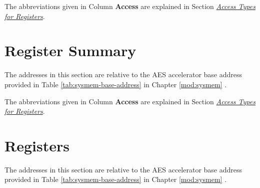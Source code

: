\documentclass[main\_\_EN.tex]{subfiles}
\begin{document}
The abbreviations given in Column \textbf{Access} are explained in Section \hyperref[glossary-access-types]{\textit{Access Types for Registers}}.



\clearpage

\hypertarget{aes-reg-summ}{}
\section{Register Summary}

The addresses in this section are relative to the AES accelerator base address provided in Table \ref{tab:sysmem-base-address} in Chapter \ref{mod:sysmem} \textit{}.

The abbreviations given in Column \textbf{Access} are explained in Section \hyperref[glossary-access-types]{\textit{Access Types for Registers}}.


\clearpage
\section{Registers}
The addresses in this section are relative to the AES accelerator base address provided in Table \ref{tab:sysmem-base-address} in Chapter \ref{mod:sysmem} \textit{}.


\end{document}
